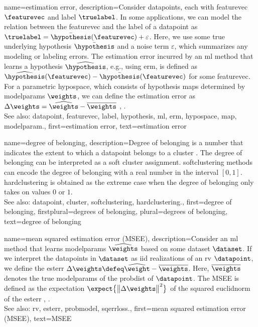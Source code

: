 {name={estimation error},
	description={Consider \glspl{datapoint}, each with \gls{featurevec} $\featurevec$ and \gls{label} 
		$\truelabel$. In some applications, we can model the relation between the \gls{featurevec} and the \gls{label}
		of a \gls{datapoint} as $\truelabel = \bar{\hypothesis}(\featurevec) + \varepsilon$. Here, we 
		use some true underlying \gls{hypothesis} $\bar{\hypothesis}$ and a noise term $\varepsilon$, 
		which summarizes any modeling or labeling errors. The estimation error incurred by an \gls{ml} 
		method that learns a \gls{hypothesis} $\widehat{\hypothesis}$, e.g., using \gls{erm}, is defined as 
		$\widehat{\hypothesis}(\featurevec) - \bar{\hypothesis}(\featurevec)$ for some \gls{featurevec}. 
		For a parametric \gls{hypospace}, which consists of \gls{hypothesis} \glspl{map} determined by 
		\glspl{modelparam} $\weights$, we can define the estimation error as 
		$\Delta \weights = \widehat{\weights} - \overline{\weights}$ \cite{kay}, \cite{hastie01statisticallearning}.
					\\ 
		See also: \gls{datapoint}, \gls{featurevec}, \gls{label}, \gls{hypothesis}, \gls{ml}, \gls{erm}, \gls{hypospace}, \gls{map}, \gls{modelparam}.},
	first={estimation error},
	text={estimation error} 
}

{name={degree of belonging}, 
	description={Degree of belonging is a number that indicates the extent to which a \gls{datapoint} 
		belongs to a \gls{cluster} \cite[Ch. 8]{MLBasics}. The degree of belonging can be 
		interpreted as a soft \gls{cluster} assignment. \Gls{softclustering} methods can 
		encode the degree of belonging with a real number in the interval $[0,1]$. 
		\Gls{hardclustering} is obtained as the extreme case when the degree of belonging 
		only takes on values $0$ or $1$.
					\\ 
		See also: \gls{datapoint}, \gls{cluster}, \gls{softclustering}, \gls{hardclustering}.}, 
	first={degree of belonging},
	firstplural={degrees of belonging},
	plural={degrees of belonging},
	text={degree of belonging} 
}

{name={mean squared estimation error (MSEE)},
	description={Consider an \gls{ml} method that 
		learns \glspl{modelparam} $\widehat{\weights}$ based on some \gls{dataset} $\dataset$. 
		If we interpret the \glspl{datapoint} in $\dataset$ as \gls{iid} \glspl{realization} of an \gls{rv} $\datapoint$, 
		we define the \gls{esterr} $\Delta \weights \defeq \widehat{\weight} - \overline{\weights}$. 
		Here, $\overline{\weights}$ denotes the true \glspl{modelparam} of the \gls{probdist} 
		of $\datapoint$. The MSEE is 
		defined as the \gls{expectation} $\expect \big\{ \big\| \Delta \weights \big\|^{2} \big\}$ of the 
		squared \gls{euclidnorm} of the \gls{esterr} \cite{LC}, \cite{kay}.
					\\ 
		See also: \gls{rv}, \gls{esterr}, \gls{probmodel}, \gls{sqerrloss}.},
	first={mean squared estimation error (MSEE)},
	text={MSEE} 
}

